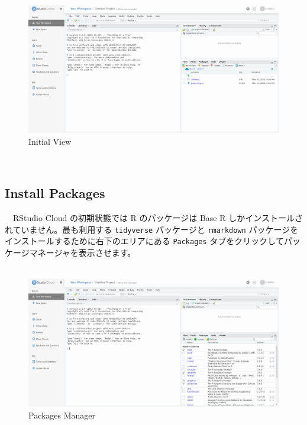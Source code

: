 \documentclass[
  12pt,
]{book}
\begin{document}
\begin{figure}[H]

{\centering \includegraphics[width=0.8\linewidth,]{fig/RStudio/RSCloud_01} 

}

\caption{Initial View}\label{fig:unnamed-chunk-129}
\end{figure}

　

\hypertarget{install-packages}{%
\subsection{Install Packages}\label{install-packages}}

　RStudio Cloud の初期状態では R のパッケージは Base R しかインストールされていません。最も利用する \texttt{tidyverse} パッケージと \texttt{rmarkdown} パッケージをインストールするために右下のエリアにある \texttt{Packages} タブをクリックしてパッケージマネージャを表示させます。\\
　\\

\begin{figure}[H]

{\centering \includegraphics[width=0.8\linewidth,]{fig/RStudio/RSCloud_02} 

}

\caption{Packages Manager}\label{fig:unnamed-chunk-130}
\end{figure}
\end{document}

